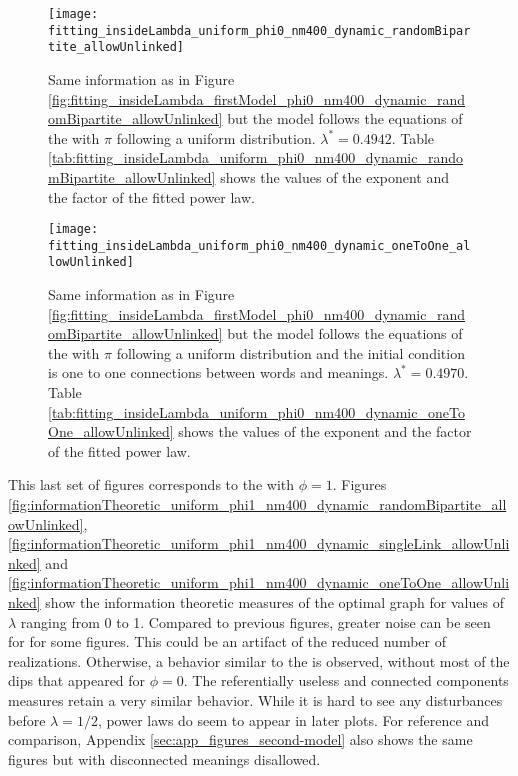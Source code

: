\begin{figure}
  \centering
  \texttt{[image: fitting\_insideLambda\_uniform\_phi0\_nm400\_dynamic\_randomBipartite\_allowUnlinked]}
  \caption{Same information as in Figure \ref{fig:fitting_insideLambda_firstModel_phi0_nm400_dynamic_randomBipartite_allowUnlinked} but the model follows the equations of the \secondmodel{} with $\pi$ following a uniform distribution. $\lambda^*=0.4942$.
Table \ref{tab:fitting_insideLambda_uniform_phi0_nm400_dynamic_randomBipartite_allowUnlinked} shows the values of the exponent and the factor of the fitted power law.}
  \label{fig:fitting_insideLambda_uniform_phi0_nm400_dynamic_randomBipartite_allowUnlinked}
\end{figure}

\begin{figure}
  \centering
  \texttt{[image: fitting\_insideLambda\_uniform\_phi0\_nm400\_dynamic\_oneToOne\_allowUnlinked]}
  \caption{Same information as in Figure \ref{fig:fitting_insideLambda_firstModel_phi0_nm400_dynamic_randomBipartite_allowUnlinked} but the model follows the equations of the \secondmodel{} with $\pi$ following a uniform distribution and the initial condition is one to one connections between words and meanings. $\lambda^*=0.4970$.
Table \ref{tab:fitting_insideLambda_uniform_phi0_nm400_dynamic_oneToOne_allowUnlinked} shows the values of the exponent and the factor of the fitted power law.}
  \label{fig:fitting_insideLambda_uniform_phi0_nm400_dynamic_oneToOne_allowUnlinked}
\end{figure}





This last set of figures corresponds to the \secondmodel{} with $\phi=1$.
Figures \ref{fig:informationTheoretic_uniform_phi1_nm400_dynamic_randomBipartite_allowUnlinked},  \ref{fig:informationTheoretic_uniform_phi1_nm400_dynamic_singleLink_allowUnlinked} and \ref{fig:informationTheoretic_uniform_phi1_nm400_dynamic_oneToOne_allowUnlinked} show the information theoretic measures of the optimal graph for values of $\lambda$ ranging from 0 to 1.
Compared to previous figures, greater noise can be seen for \lambdaZeroToHalf{} for some figures.
This could be an artifact of the reduced number of realizations.
Otherwise, a behavior similar to the \firstmodel{} is observed, without most of the dips that appeared for $\phi=0$.
The referentially useless and connected components measures retain a very similar behavior.
While it is hard to see any disturbances before $\lambda = 1/2$, power laws do seem to appear in later plots.
For reference and comparison, Appendix \ref{sec:app_figures_second-model} also shows the same figures but with disconnected meanings disallowed.

